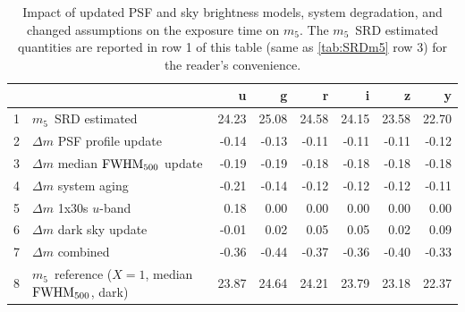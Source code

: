 \documentclass[PST,authoryear,toc]{lsstdoc}
\newcommand{\cm}{\ensuremath{C_m}}
\newcommand{\mf}{\ensuremath{m_5}}
\begin{document}
 \begin{table}[h!]
\caption{Impact of updated PSF and sky brightness models, system degradation, and changed assumptions on the exposure time on \mf. The \mf\ SRD estimated quantities are reported in  row 1 of this table (same as \autoref{tab:SRDm5} row 3) for the reader's convenience.}\label{tab:bl1}
\vskip 0.05in
    \centering
\begin{tabular}{llrrrrrr}
\hline
{} &{}&      u &      g &      r &      i &      z &      y \\
\hline
1& \mf\ SRD estimated                    &  24.23 &  25.08 &  24.58 &  24.15 &  23.58 &  22.70 \\
\hline
\hline
2& $\Delta m$ PSF profile update    &   -0.14 &   -0.13 &   -0.11 &   -0.11 &   -0.11 &   -0.12 \\
3& $\Delta m$ median ${\rm FWHM}_{500}$ update &   -0.19 &   -0.19 &   -0.18 &   -0.18 &   -0.18 &   -0.18 \\
4& $\Delta m$ system aging         &   -0.21 &   -0.14 &   -0.12 &   -0.12 &   -0.12 &   -0.11 \\
5&$\Delta m$ 1x30s $u$-band          &  0.18 &   0.00 &   0.00 &   0.00 &   0.00 &   0.00 \\
6& $\Delta m$ dark sky update       &   -0.01 &  0.02 &  0.05 &  0.05 &  0.02 &  0.09 \\
\hline
7& $\Delta m$ combined              &   -0.36 &   -0.44 &   -0.37 &   -0.36 &   -0.40 &   -0.33 \\
\hline
\hline
8& \mf\ reference   ($X=1$, median ${\rm FWHM}_{500}$, dark)        &  23.87 &  24.64 &  24.21 &  23.79 &  23.18 &  22.37 \\
\hline
\end{tabular}
\end{table}

 \FloatBarrier
 
  
\end{document}
